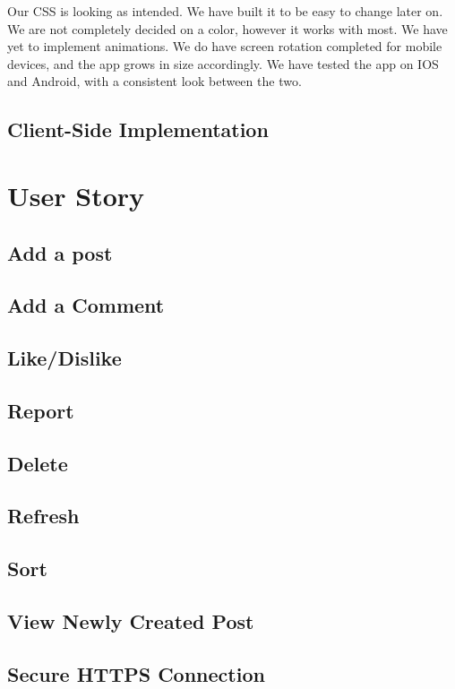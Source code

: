 \documentclass[12pt]{article}
\begin{document}
Our CSS is looking as intended. We have built it to be easy to change later on. We are not completely decided on a color, however it works with most. We have yet to implement animations. We do have screen rotation completed for mobile devices, and the app grows in size accordingly. We have tested the app on IOS and Android, with a consistent look between the two.
   \subsection{Client-Side Implementation}
\section{User Story}
      \subsection{Add a post}

      \subsection{Add a Comment}

      \subsection{Like/Dislike}

      \subsection{Report}

      \subsection{Delete}

      \subsection{Refresh}

      \subsection{Sort}

      \subsection{View Newly Created Post}

      \subsection{Secure HTTPS Connection}
\end{document}
